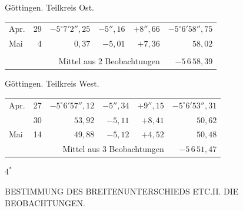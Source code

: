 \noindent\begin{minipage}[t]{.495\textwidth}\centering Göttingen. Teilkreis Ost.\par\smallskip
{\scriptsize\setlength{\tabcolsep}{1pt}\renewcommand{\arraystretch}{1.2}\begin{tabular}{lr|r|r|r|r|}
Apr.&29&$-5^\circ7'2''{,}25$&$-5''{,}16$&$+8''{,}66$&$-5^\circ6'58''{,}75$\\
Mai&4&$0{,}37$&$-5{,}01$&$+7{,}36$&$58{,}02$\\
&&&&&\\
\cline{6-6}\multicolumn{5}{r}{Mittel aus 2 Beobachtungen}&$-5\,6\,58{,}39$
\end{tabular}}\end{minipage}\hfill\begin{minipage}[t]{.495\textwidth}\centering Göttingen. Teilkreis West.\par\smallskip
{\scriptsize\setlength{\tabcolsep}{1pt}\renewcommand{\arraystretch}{1.2}\begin{tabular}{lr|r|r|r|r}
Apr.&27&$-5^\circ6'57''{,}12$&$-5''{,}34$&$+9''{,}15$&$-5^\circ6'53''{,}31$\\
&30&$53{,}92$&$-5{,}11$&$+8{,}41$&$50{,}62$\\
Mai&14&$49{,}88$&$-5{,}12$&$+4{,}52$&$50{,}48$\\
\cline{6-6}\multicolumn{5}{r}{Mittel aus 3 Beobachtungen}&$-5\,6\,51{,}47$
\end{tabular}}\end{minipage}
\par\vspace{4mm}
\begin{flushright}$4^{\ast}$\end{flushright}

\clearpage
\noindent{}\parbox[t]{\dimexpr\textwidth-10mm\relax}{\centering\scriptsize BESTIMMUNG DES BREITENUNTERSCHIEDS ETC.\quad II. DIE BEOBACHTUNGEN.}\par

